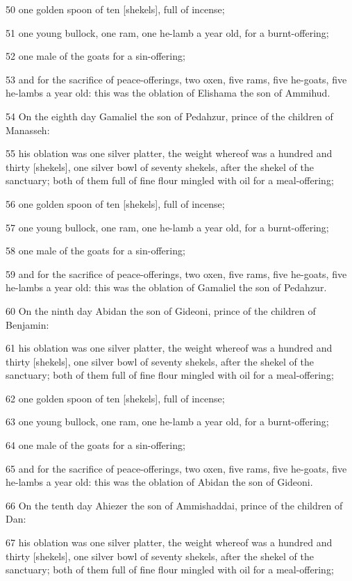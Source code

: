 \par 50 one golden spoon of ten [shekels], full of incense;
\par 51 one young bullock, one ram, one he-lamb a year old, for a burnt-offering;
\par 52 one male of the goats for a sin-offering;
\par 53 and for the sacrifice of peace-offerings, two oxen, five rams, five he-goats, five he-lambs a year old: this was the oblation of Elishama the son of Ammihud.
\par 54 On the eighth day Gamaliel the son of Pedahzur, prince of the children of Manasseh:
\par 55 his oblation was one silver platter, the weight whereof was a hundred and thirty [shekels], one silver bowl of seventy shekels, after the shekel of the sanctuary; both of them full of fine flour mingled with oil for a meal-offering;
\par 56 one golden spoon of ten [shekels], full of incense;
\par 57 one young bullock, one ram, one he-lamb a year old, for a burnt-offering;
\par 58 one male of the goats for a sin-offering;
\par 59 and for the sacrifice of peace-offerings, two oxen, five rams, five he-goats, five he-lambs a year old: this was the oblation of Gamaliel the son of Pedahzur.
\par 60 On the ninth day Abidan the son of Gideoni, prince of the children of Benjamin:
\par 61 his oblation was one silver platter, the weight whereof was a hundred and thirty [shekels], one silver bowl of seventy shekels, after the shekel of the sanctuary; both of them full of fine flour mingled with oil for a meal-offering;
\par 62 one golden spoon of ten [shekels], full of incense;
\par 63 one young bullock, one ram, one he-lamb a year old, for a burnt-offering;
\par 64 one male of the goats for a sin-offering;
\par 65 and for the sacrifice of peace-offerings, two oxen, five rams, five he-goats, five he-lambs a year old: this was the oblation of Abidan the son of Gideoni.
\par 66 On the tenth day Ahiezer the son of Ammishaddai, prince of the children of Dan:
\par 67 his oblation was one silver platter, the weight whereof was a hundred and thirty [shekels], one silver bowl of seventy shekels, after the shekel of the sanctuary; both of them full of fine flour mingled with oil for a meal-offering;
